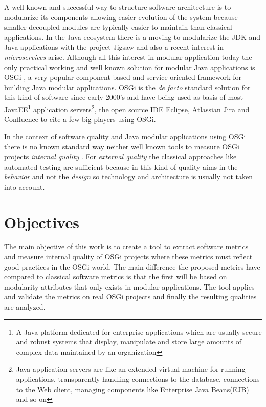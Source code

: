 A well known and successful way to structure software architecture is to modularize its components allowing easier evolution of the system because smaller decoupled modules are typically easier to maintain than classical applications. In the Java ecosystem there is a moving to modularize the JDK and Java applications with the project Jigsaw \citep{Krill 2012} and also a recent interest in \emph{microservices} \citep{Knorr 2014} arise. Although all this interest in modular application today the only practical working and well known solution for modular Java applications is OSGi \citep{Hall 2011}, a very popular component-based and service-oriented framework for building Java modular applications. OSGi is the \emph{de facto} standard solution for this kind of software since early 2000's and have being used as basis of most JavaEE\footnote{A Java platform dedicated for enterprise applications which are usually secure and robust systems that display, manipulate and store large amounts of complex data maintained by an organization} application servers\footnote{Java application servers are like an extended virtual machine for running applications, transparently handling connections to the database, connections to the Web client, managing components like Enterprise Java Beans(EJB) and so on}, the open source IDE Eclipse\citep{eclipse 2006}, Atlassian Jira and Confluence to cite a few big players using OSGi. 

In the context of software quality and Java modular applications using OSGi there is no known standard way neither well known tools to measure OSGi projects \textit{internal quality} \citep{Hamza 2013} \citep{Wang 2012}. For \emph{external quality} the classical approaches like automated testing are sufficient because in this kind of quality aims in the \emph{behavior} and not the \emph{design} so technology and architecture is usually not taken into account.

        
\section{Objectives}
The main objective of this work is to create a tool to extract software metrics and measure internal quality of OSGi projects where these metrics must reflect good practices in the OSGi world. The main difference the proposed metrics have compared to classical software metrics is that the first will be based on modularity attributes that only exists in modular applications. The tool applies and validate the metrics on real OSGi projects and finally the resulting qualities are analyzed.  


